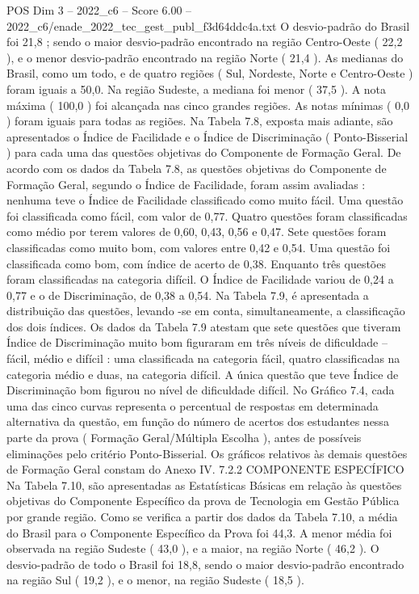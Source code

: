 \begin{textsample}{POS Dim 3 – 2022\_c6 – Score 6.00 – 2022\_c6/enade\_2022\_tec\_gest\_publ\_f3d64ddc4a.txt}
O desvio-padrão do Brasil foi 21,8 ; sendo o maior desvio-padrão encontrado na região Centro-Oeste ( 22,2 ), e o menor desvio-padrão encontrado na região Norte ( 21,4 ).
As medianas do Brasil, como um todo, e de quatro regiões ( Sul, Nordeste, Norte e Centro-Oeste ) foram iguais a 50,0.
Na região Sudeste, a mediana foi menor ( 37,5 ).
A nota máxima ( 100,0 ) foi alcançada nas cinco grandes regiões.
As notas mínimas ( 0,0 ) foram iguais para todas as regiões.
Na Tabela 7.8, exposta mais adiante, são apresentados o Índice de Facilidade e o Índice de Discriminação ( Ponto-Bisserial ) para cada uma das questões objetivas do Componente de Formação Geral.
De acordo com os dados da Tabela 7.8, as questões objetivas do Componente de Formação Geral, segundo o Índice de Facilidade, foram assim avaliadas : nenhuma teve o Índice de Facilidade classificado como muito fácil.
Uma questão foi classificada como fácil, com valor de 0,77.
Quatro questões foram classificadas como médio por terem valores de 0,60, 0,43, 0,56 e 0,47.
Sete questões foram classificadas como muito bom, com valores entre 0,42 e 0,54.
Uma questão foi classificada como bom, com índice de acerto de 0,38.
Enquanto três questões foram classificadas na categoria difícil.
O Índice de Facilidade variou de 0,24 a 0,77 e o de Discriminação, de 0,38 a 0,54.
Na Tabela 7.9, é apresentada a distribuição das questões, levando -se em conta, simultaneamente, a classificação dos dois índices.
Os dados da Tabela 7.9 atestam que sete questões que tiveram Índice de Discriminação muito bom figuraram em três níveis de dificuldade – fácil, médio e difícil : uma classificada na categoria fácil, quatro classificadas na categoria médio e duas, na categoria difícil.
A única questão que teve Índice de Discriminação bom figurou no nível de dificuldade difícil.
No Gráfico 7.4, cada uma das cinco curvas representa o percentual de respostas em determinada alternativa da questão, em função do número de acertos dos estudantes nessa parte da prova ( Formação Geral/Múltipla Escolha ), antes de possíveis eliminações pelo critério Ponto-Bisserial.
Os gráficos relativos às demais questões de Formação Geral constam do Anexo IV. 7.2.2 COMPONENTE ESPECÍFICO Na Tabela 7.10, são apresentadas as Estatísticas Básicas em relação às questões objetivas do Componente Específico da prova de Tecnologia em Gestão Pública por grande região.
Como se verifica a partir dos dados da Tabela 7.10, a média do Brasil para o Componente Específico da Prova foi 44,3.
A menor média foi observada na região Sudeste ( 43,0 ), e a maior, na região Norte ( 46,2 ).
O desvio-padrão de todo o Brasil foi 18,8, sendo o maior desvio-padrão encontrado na região Sul ( 19,2 ), e o menor, na região Sudeste ( 18,5 ).

\end{textsample}
